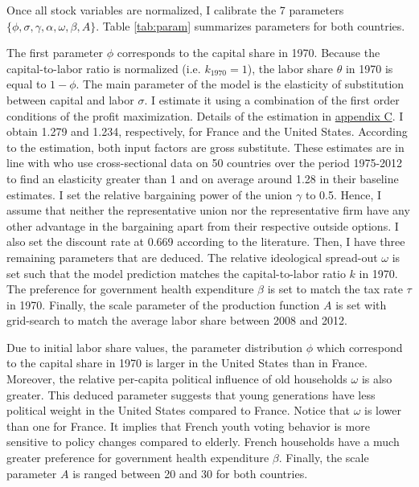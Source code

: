 Once all stock variables are normalized, I calibrate the 7 parameters $\lbrace \phi, \sigma, \gamma, \alpha, \omega, \beta, A \rbrace$. Table \ref{tab:param} summarizes parameters for both countries.

The first parameter $\phi$ corresponds to the capital share in 1970. Because the capital-to-labor ratio is normalized (i.e. $k_{1970} = 1$), the labor share $\theta$ in 1970 is equal to $1-\phi$. The main parameter of the model is the elasticity of substitution between capital and labor $\sigma$. I estimate it using a combination of the first order conditions of the profit maximization. Details of the estimation in \hyperref[appendix:sigma]{appendix C}. I obtain 1.279 and 1.234, respectively, for France and the United States. According to the estimation, both input factors are gross substitute. These estimates are in line with \cite{Karabarbounis2014} who use cross-sectional data on 50 countries over the period 1975-2012 to find an elasticity greater than 1 and on average around 1.28 in their baseline estimates. I set the relative bargaining power of the union $\gamma$ to 0.5. Hence, I assume that neither the representative union nor the representative firm have any other advantage in the bargaining apart from their respective outside options. I also set the discount rate at 0.669 according to the literature. Then, I have three remaining parameters that are deduced. The relative ideological spread-out $\omega$ is set such that the model prediction matches the capital-to-labor ratio $k$ in 1970. The preference for government health expenditure $\beta$ is set to match the tax rate $\tau$ in 1970. Finally, the scale parameter of the production function $A$ is set with grid-search to match the average labor share between 2008 and 2012.

Due to initial labor share values, the parameter distribution $\phi$ which correspond to the capital share in 1970 is larger in the United States than in France. Moreover, the relative per-capita political influence of old households $\omega$ is also greater. This deduced parameter suggests that young generations have less political weight in the United States compared to France. Notice that $\omega$ is lower than one for France. It implies that French youth voting behavior is more sensitive to policy changes compared to elderly. French households have a much greater preference for government health expenditure $\beta$. Finally, the scale parameter $A$ is ranged between 20 and 30 for both countries.

